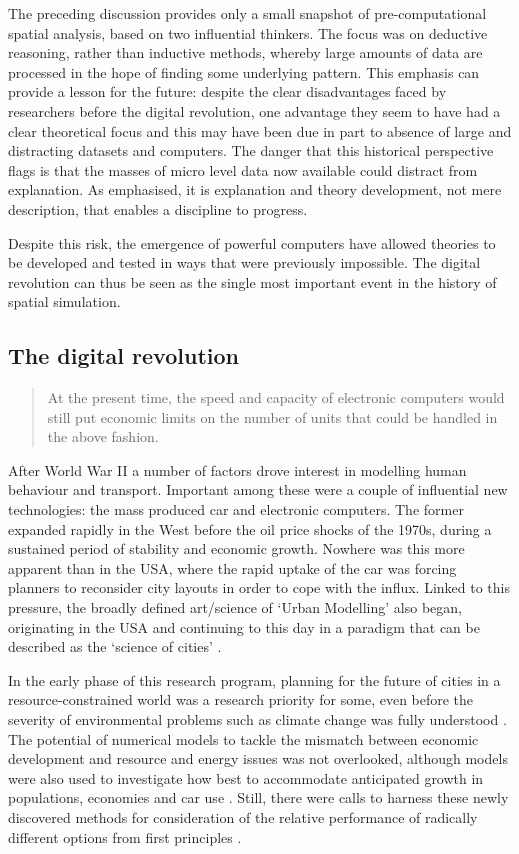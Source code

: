 \documentclass[a4paper, 11pt, twoside]{Thesis}
\begin{document}
The preceding discussion provides only a small snapshot of pre-computational
spatial analysis, based on two influential thinkers. The
focus was on deductive reasoning, rather than inductive methods, whereby large
amounts of data are processed in the hope of finding some underlying pattern.
This emphasis can provide a lesson for the future: despite the clear
disadvantages faced by researchers before the digital revolution, one
advantage they seem to have had a clear theoretical focus and this may
have been due in part to absence of large and distracting datasets and
computers.
The danger that this historical perspective flags is that the masses of
micro level data now available could distract from explanation. As
\citet{Wilson1972-theoretical} emphasised, it is explanation and theory
development, not mere description, that enables a discipline to progress. 

Despite this risk, the emergence of powerful computers have allowed theories to
be developed and tested in ways that were previously impossible. The digital
revolution can thus be seen as the single most important event in the history
of spatial simulation.

\subsection{The digital revolution}
\label{s:digirev}
\begin{quote}
 At the present time, the speed and capacity
of electronic computers would still put economic limits on the number of units
that could be handled in the above fashion.
\end{quote}

After World War II a number of factors drove interest in modelling human
behaviour and transport. Important among these were a couple of influential new
technologies: the mass produced car and electronic computers. The former
expanded rapidly in the West before the oil price shocks of the
1970s, during a sustained period of stability and economic growth. Nowhere
was this more apparent than in the USA, where the rapid uptake of the car was
forcing planners to reconsider city layouts in order to cope with the influx.
Linked to this pressure, the broadly defined art/science of `Urban Modelling'
also
began, originating in the USA \citep{batty1976urban} and continuing to this
day in a paradigm that can be described as the `science of cities' \citep{Batty2012}.

In the early phase of this research program, planning for the future
of cities in a resource-constrained world was a research priority for some,
even before the severity of environmental problems such as climate change was
fully understood \citep{Rouse1975}. The potential of numerical models to tackle
the mismatch between economic development and resource and energy issues was
not overlooked, although models were also used to investigate
how best to accommodate anticipated growth in populations, economies and
car use \citep{Irwin1973-simulation}.
Still, there were calls to harness these newly discovered methods
for consideration of the relative performance of
radically different options from first principles \citep{manheim1968search, TUI1972}.
\end{document}
